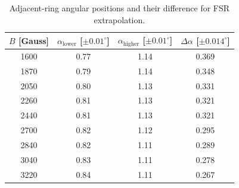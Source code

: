 \begin{table}[H]
\centering
\begin{tabular}{cccc}
\hline
    $B$ [Gauss] & $\alpha_{\mathrm{lower}}$ [$\pm 0.01^\circ$] & $\alpha_{\mathrm{higher}}$ [$\pm 0.01^\circ$] & $\Delta\alpha$ [$\pm 0.014^\circ$] \\
\hline
    1600 & 0.77 & 1.14 & 0.369 \\
    1870 & 0.79 & 1.14 & 0.348 \\
    2050 & 0.80 & 1.13 & 0.331 \\
    2260 & 0.81 & 1.13 & 0.321 \\
    2440 & 0.81 & 1.13 & 0.321 \\
    2700 & 0.82 & 1.12 & 0.295 \\
    2840 & 0.82 & 1.11 & 0.289 \\
    3040 & 0.83 & 1.11 & 0.278 \\
    3220 & 0.84 & 1.11 & 0.267 \\
\hline
\end{tabular}
\caption{Adjacent-ring angular positions and their difference for FSR extrapolation.}
\label{tab:fsr}
\end{table}
